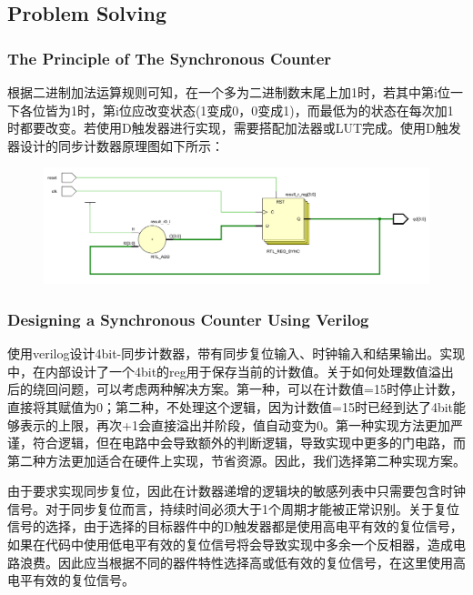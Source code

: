 \documentclass[11pt, a4 paper]{article}
\begin{document}
\subsection{Problem Solving}
\subsubsection{The Principle of The Synchronous Counter}
根据二进制加法运算规则可知，在一个多为二进制数末尾上加1时，若其中第i位一下各位皆为1时，第i位应改变状态(1变成0，0变成1)，而最低为的状态在每次加1时都要改变。若使用D触发器进行实现，需要搭配加法器或LUT完成。使用D触发器设计的同步计数器原理图如下所示：
\begin{figure}[h]
    \centering
    \includegraphics[width=1\linewidth]{image/counter0.png}
\end{figure}
\subsubsection{Designing a Synchronous Counter Using Verilog}
使用verilog设计4bit-同步计数器，带有同步复位输入、时钟输入和结果输出。实现中，在内部设计了一个4bit的reg用于保存当前的计数值。关于如何处理数值溢出后的绕回问题，可以考虑两种解决方案。第一种，可以在计数值=15时停止计数，直接将其赋值为0；第二种，不处理这个逻辑，因为计数值=15时已经到达了4bit能够表示的上限，再次+1会直接溢出并阶段，值自动变为0。第一种实现方法更加严谨，符合逻辑，但在电路中会导致额外的判断逻辑，导致实现中更多的门电路，而第二种方法更加适合在硬件上实现，节省资源。因此，我们选择第二种实现方案。

由于要求实现同步复位，因此在计数器递增的逻辑块的敏感列表中只需要包含时钟信号。对于同步复位而言，持续时间必须大于1个周期才能被正常识别。关于复位信号的选择，由于选择的目标器件中的D触发器都是使用高电平有效的复位信号，如果在代码中使用低电平有效的复位信号将会导致实现中多余一个反相器，造成电路浪费。因此应当根据不同的器件特性选择高或低有效的复位信号，在这里使用高电平有效的复位信号。
\end{document}
